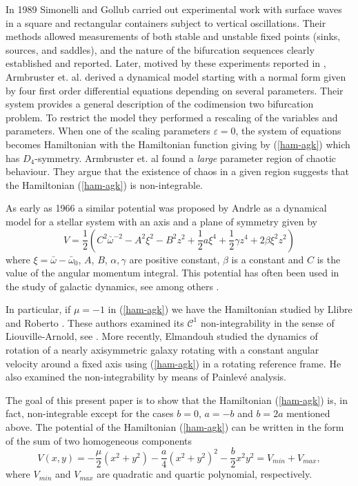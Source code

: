 \documentclass[final]{siamart0516}
\begin{document}
In 1989 Simonelli and Gollub \cite{sg}  carried out experimental work with
surface waves in a square and rectangular containers subject to vertical oscillations. Their methods allowed measurements of both stable and unstable fixed points (sinks, sources, and saddles), and the nature of the bifurcation sequences  clearly established and reported. 
 Later,  motived by these experiments reported in \cite{sg},  Armbruster et. al. \cite{agk} derived a dynamical model starting with a normal form given by 
 four first order differential equations depending on several parameters. Their system provides 
a general description of the codimension two bifurcation problem.
 To restrict the model they performed a  rescaling of the variables and parameters.  
When one of the scaling parameters $\varepsilon = 0$, the system of  equations becomes Hamiltonian with
the Hamiltonian function giving by (\ref{ham-agk}) which has $D_4$-symmetry.
Armbruster et. al \cite{agk}  found  a {\em large} parameter region of chaotic behaviour.
They argue that the existence of chaos in a given region suggests that  the Hamiltonian (\ref{ham-agk}) is  non-integrable.


As early as 1966  a  similar potential  was proposed  by Andrle \cite{andrle} 
as a dynamical model for a stellar system with an axis and a plane of symmetry given by 
$$V=\frac{1}{2} (C^2{\bar\omega}^{-2}-A^2\xi^2-B^2z^2+\frac{1}{2}a\xi^4+\frac{1}{2}\gamma z^4+2\beta\xi^2z^2)$$
where $\xi = {\bar\omega}- {\bar\omega}_0$, $A$, $B$, $\alpha,\gamma$ are positive constant, $\beta$ is a constant and
$C$ is the value of the angular momentum integral.
This potential  has often been used in the study of galactic dynamics, see  among others \cite{contra}.

In particular,  if  $\mu=-1$  in  (\ref{ham-agk}) we have the Hamiltonian studied  by  Llibre and Roberto \cite{llibre}. These authors examined  its ${\mathcal C}^1$ non-integrability in the sense of
Liouville-Arnold, see \cite{am}. More recently,  Elmandouh \cite{elmandouh} studied the dynamics of 
rotation of a nearly axisymmetric galaxy rotating 
with a constant angular velocity  around a fixed axis
using (\ref{ham-agk})  in a rotating reference frame. He also examined the  non-integrability by means of
 Painlev\'e analysis.
 
The goal of this present paper is to show  that the Hamiltonian (\ref{ham-agk}) is, in fact, non-integrable except for the cases $b=0$, $a=-b$ and $b=2a$ mentioned above.
The potential of the Hamiltonian (\ref{ham-agk}) can be written in the form of the sum of two  homogeneous components 
$$
V(x,y)= -\frac{\mu}{2}(x^2+y^2)-\frac{a}{4} (x^2+y^2)^2- \frac{b}{2} x^2y^2 =V_{min} + V_{max},
$$
where $V_{min}$ and  $V_{max}$ are quadratic and quartic polynomial, respectively.
\end{document}
